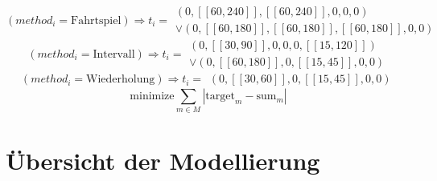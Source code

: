 \begin{equation*}
    (method_i = \text{Fahrtspiel})\Rightarrow t_i = \begin{array}{c}
            (0, [\![60, 240]\!], [\![60, 240]\!], 0, 0, 0) \\ 
        \vee (0, [\![60,180]\!], [\![60, 180]\!], [\![60, 180]\!], 0, 0)
    \end{array}
\end{equation*}
\begin{equation*}
    (method_i = \text{Intervall})\Rightarrow t_i = \begin{array}{c}
            (0, [\![30, 90]\!], 0, 0, 0, [\![15, 120]\!]) \\ 
        \vee (0, [\![60,180]\!], 0, [\![15, 45]\!], 0, 0)
    \end{array}
\end{equation*}
\begin{equation*}
    (method_i = \text{Wiederholung})\Rightarrow t_i = \begin{array}{c}
            (0, [\![30, 60]\!], 0, [\![15, 45]\!], 0, 0)
    \end{array}
\end{equation*}
\begin{equation*}
    \text{minimize} \sum_{m\in M} |\text{target}_m - \text{sum}_m|
\end{equation*} 

\newpage
\section{Übersicht der Modellierung}
\label{anhang:modellierung:gross}

